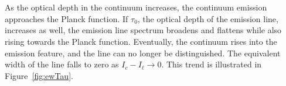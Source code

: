 \documentclass[12pt]{article}
\begin{document}
\section{}
As the optical depth in the continuum increases, the continuum emission approaches the Planck function.  If $\tau_0$, the optical depth of the emission line, increases as well, the emission line spectrum broadens and flattens while also rising towards the Planck function.  Eventually, the continuum rises into the emission feature, and the line can no longer be distinguished.  The equivalent width of the line falls to zero as $I_c-I_\ell\rightarrow 0$.  This trend is illustrated in Figure~\ref{fig:ewTau}.
\figEWTau
\end{document}

